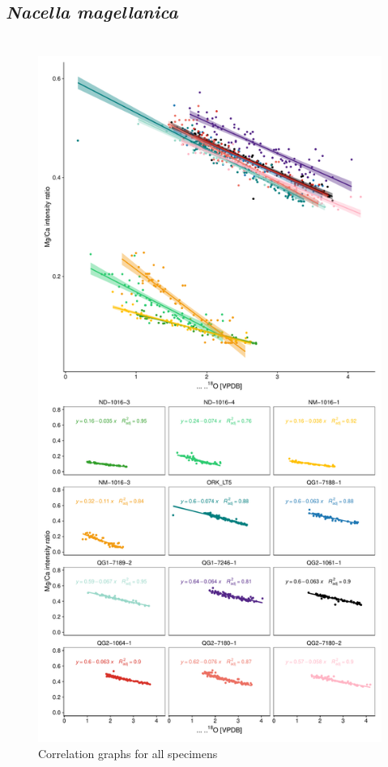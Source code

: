 \documentclass[
  authoryear,
  preprint,
  3p]{elsarticle}
\begin{document}
\subsection{\texorpdfstring{\emph{Nacella
magellanica}}{Nacella magellanica}}\label{nacella-magellanica}

\section{}\label{section}

\begin{figure}[H]

{\centering \includegraphics{Manuscript_files/figure-pdf/Correlation Graphs-1.pdf}

}

\caption{Correlation graphs for all specimens}

\end{figure}%
\end{document}
